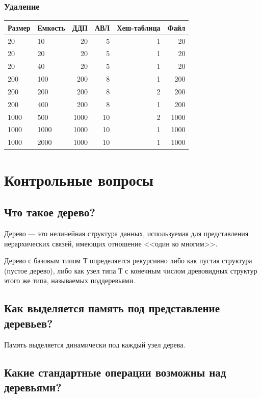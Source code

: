 \documentclass[a4paper,12pt]{extarticle}
\begin{document}
\subsubsection{Удаление}

\begin{tabular}{ |l|l|r|r|r|r| }
\hline
\textbf{Размер} & \textbf{Емкость} & \textbf{ДДП} & \textbf{АВЛ} & \textbf{Хеш-таблица} & \textbf{Файл} \\ \hline
20 & 10 & 20 & 5 & 1 & 20 \\ \hline
20 & 20 & 20 & 5 & 1 & 20 \\ \hline
20 & 40 & 20 & 5 & 1 & 20 \\ \hline
200 & 100 & 200 & 8 & 1 & 200 \\ \hline
200 & 200 & 200 & 8 & 2 & 200 \\ \hline
200 & 400 & 200 & 8 & 1 & 200 \\ \hline
1000 & 500 & 1000 & 10 & 2 & 1000 \\ \hline
1000 & 1000 & 1000 & 10 & 1 & 1000 \\ \hline
1000 & 2000 & 1000 & 10 & 1 & 1000 \\ \hline



\end{tabular}

\newpage


\section{Контрольные вопросы}
\subsection{Что такое дерево?}
Дерево --- это нелинейная структура данных, используемая для представления иерархических связей, имеющих отношение <<один ко многим>>.

Дерево с базовым типом $Т$ определяется рекурсивно либо как пустая структура (пустое дерево), либо как узел типа $Т$ с конечным числом древовидных структур этого же типа, называемых поддеревьями.

\subsection{Как выделяется память под представление деревьев?}

Память выделяется динамически под каждый узел дерева.

\subsection{Какие стандартные операции возможны над деревьями?}
\end{document}
